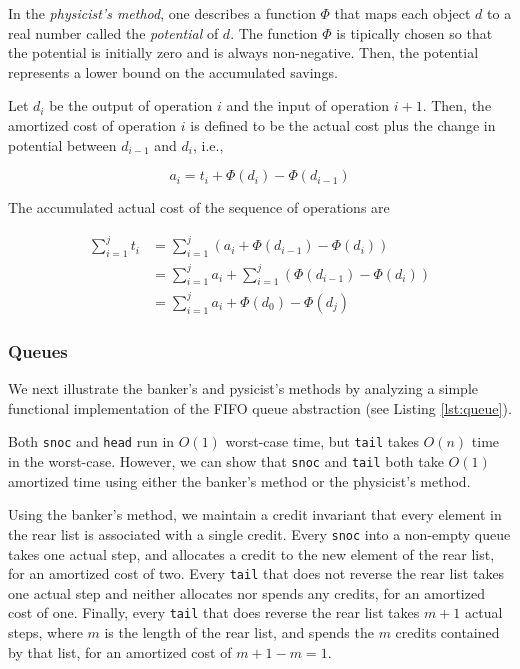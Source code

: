 \documentclass[12pt, a4paper]{article} %
\newcommand{\code}[1]{\texttt{#1}} %
\begin{document}
In the \textit{physicist's method}, one describes a function $\Phi$ that maps each object $d$ to a real number called the \textit{potential} of $d$. The function $\Phi$ is tipically chosen so that the potential is initially zero and is always non-negative. Then, the potential represents a lower bound on the accumulated savings.

Let $d_i$ be the output of operation $i$ and the input of operation $i+1$. Then, the amortized cost of operation $i$ is defined to be the actual cost plus the change in potential between $d_{i-1}$ and $d_i$, i.e.,

\begin{equation}%
\label{physicist's method equation}
  a_i = t_i + \Phi(d_i) - \Phi(d_{i-1})
\end{equation}

The accumulated actual cost of the sequence of operations are

\begin{align*}%
\label{physicist's cost}
  \sum_{i=1}^{j} t_i &= \sum_{i=1}^{j} (a_i + \Phi(d_{i-1}) - \Phi(d_i)) \\
                     &= \sum_{i=1}^{j} a_i + \sum_{i=1}^{j} (\Phi(d_{i-1}) - \Phi(d_i)) \\
                     &= \sum_{i=1}^{j} a_i + \Phi(d_0) - \Phi(d_j)
\end{align*}


\subsubsection{Queues}%
\label{subsub:Queues}

We next illustrate the banker's and pysicist's methods by analyzing a simple functional implementation of the FIFO queue abstraction (see Listing \ref{lst:queue}).

Both \code{snoc} and \code{head} run in $O(1)$ worst-case time, but \code{tail} takes $O(n)$ time in the worst-case. However, we can show that \code{snoc} and \code{tail} both take $O(1)$ amortized time using either the banker's method or the physicist's method.

Using the banker's method, we maintain a credit invariant that every element in the rear list is associated with a single credit. Every \code{snoc} into a non-empty queue takes one actual step, and allocates a credit to the new element of the rear list, for an amortized cost of two. Every \code{tail} that does not reverse the rear list takes one actual step and neither allocates nor spends any credits, for an amortized cost of one. Finally, every \code{tail} that does reverse the rear list takes $m + 1$ actual steps, where $m$ is the length of the rear list, and spends the $m$ credits contained by that list, for an amortized cost of $m + 1 - m = 1$.
\end{document}
